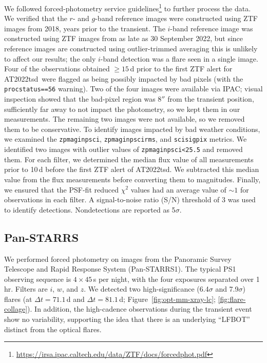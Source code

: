 \documentclass{nature_plusfigure}
\newcommand{\at}{AT2022tsd}
\begin{document}
\begin{methods}
We followed forced-photometry service guidelines\footnote{\url{https://irsa.ipac.caltech.edu/data/ZTF/docs/forcedphot.pdf}} to further process the data.
We verified that the $r$- and $g$-band reference images were constructed using ZTF images from 2018, years prior to the transient. The $i$-band reference image was constructed using ZTF images from as late as 30 September 2022, but since reference images are constructed using outlier-trimmed averaging\cite{Masci2019} this is unlikely to affect our results; the only $i$-band detection was a flare seen in a single image. 
Four of the observations obtained $\geq 15$\,d prior to the first ZTF alert for \at\ were flagged as being possibly impacted by bad pixels (with the \texttt{procstatus==56} warning).
Two of the four images were available via IPAC; visual inspection showed that the bad-pixel region was 8$''$ from the transient position, sufficiently far away to not impact the photometry, so we kept them in our measurements.
The remaining two images were not available, so we removed them to be conservative.
To identify images impacted by bad weather conditions, we examined the \texttt{zpmaginpsci}, \texttt{zpmaginpscirms}, and \texttt{scisigpix} metrics. We identified two images with outlier values of \texttt{zpmaginpsci<25.5} and removed them.
For each filter, we determined the median flux value of all measurements prior to 10\,d before the first ZTF alert of \at. We subtracted this median value from the flux measurements before converting them to magnitudes.
Finally, we ensured that the PSF-fit reduced $\chi^2$ values had an average value of $\sim 1$ for observations in each filter.
A signal-to-noise ratio (S/N) threshold of 3 was used to identify detections. Nondetections are reported as 5$\sigma$.

\subsection{Pan-STARRS}
\label{sec:panstarrs}

We performed forced photometry on images from the Panoramic Survey Telescope and Rapid Response System (Pan-STARRS1\cite{Tonry2012,Chambers2016,Flewelling2020}).
The typical PS1 observing sequence is $4\times45$\,s per night, with the
four exposures separated over 1\,hr. Filters are $i$, $w$, and $z$\cite{Tonry2012}.
We detected two high-significance (6.4$\sigma$ and 7.9$\sigma$) flares (at $\Delta t=71.1$\,d and $\Delta t=81.1\,$d; Figure~\ref{fig:opt-mm-xray-lc}; \ref{fig:flare-collage}).
In addition, the high-cadence observations during the transient event show no variability, supporting the idea that there is an underlying ``LFBOT'' distinct from the optical flares.


\end{methods}
\end{document}
